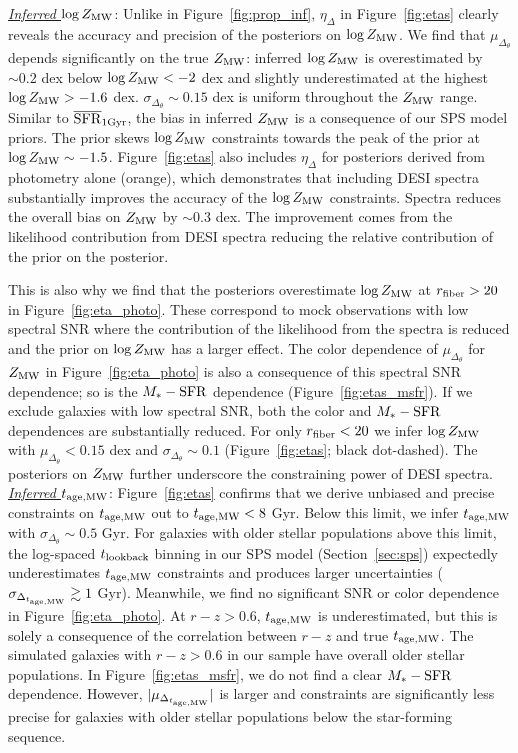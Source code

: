 \noindent \underline{\emph{Inferred $\log Z_{\rm MW}$}}:  
Unlike in Figure~\ref{fig:prop_inf}, $\eta_\Delta$ in Figure~\ref{fig:etas}
clearly reveals the accuracy and precision of the posteriors on $\log Z_{\rm MW}$. 
We find that $\mu_{\Delta_{\theta}}$ depends significantly on the true $Z_{\rm MW}$: 
inferred $\log Z_{\rm MW}$ is overestimated by ${\sim}0.2$ dex below $\log Z_{\rm MW} <
-2$ dex and slightly underestimated at the highest $\log Z_{\rm MW} > -1.6$ dex.
$\sigma_{\Delta_\theta} \sim 0.15$ dex is uniform throughout the $Z_{\rm MW}$ range.
Similar to $\overline{\rm SFR}_{\rm 1Gyr}$, the bias in inferred $Z_{\rm MW}$ is a consequence of our SPS
model priors. 
The prior skews $\log Z_{\rm MW}$ constraints towards the peak of the prior at
$\log Z_{\rm MW}\sim-1.5$. 
Figure~\ref{fig:etas} also includes $\eta_\Delta$ for posteriors derived from
photometry alone (orange), which demonstrates that including DESI spectra
substantially improves the accuracy of the $\log Z_{\rm MW}$ constraints.
Spectra reduces the overall bias on $Z_{\rm MW}$ by $\sim$0.3 dex. 
The improvement comes from the likelihood contribution from DESI spectra
reducing the relative contribution of the prior on the posterior. 

This is also why we find that the posteriors overestimate $\log Z_{\rm MW}$ at 
$r_{\rm fiber} > 20$ in Figure~\ref{fig:eta_photo}.
These correspond to mock observations with low spectral SNR where the
contribution of the likelihood from the spectra is reduced and the prior on
$\log Z_{\rm MW}$ has a larger effect.
The color dependence of $\mu_{\Delta_\theta}$ for $Z_{\rm MW}$ in
Figure~\ref{fig:eta_photo} is also a consequence of this spectral SNR
dependence; so is the $M_*-{\rm SFR}$ dependence (Figure~\ref{fig:etas_msfr}).
If we exclude galaxies with low spectral SNR, both the color and $M_*-{\rm
SFR}$  dependences are substantially reduced.
For only $r_{\rm fiber} < 20$ we infer $\log Z_{\rm MW}$ with
$\mu_{\Delta_\theta}<0.15$ dex and $\sigma_{\Delta_\theta}\sim0.1$
(Figure~\ref{fig:etas}; black dot-dashed). 
The posteriors on $Z_{\rm MW}$ further underscore the constraining power of DESI
spectra. \\

\noindent \underline{\emph{Inferred $t_{\rm age, MW}$}}:  
Figure~\ref{fig:etas} confirms that we derive unbiased and precise constraints
on $t_{\rm age, MW}$ out to $t_{\rm age, MW} < 8$ Gyr. 
Below this limit, we infer $t_{\rm age, MW}$ with $\sigma_{\Delta_\theta}{\sim}0.5$ Gyr.
For galaxies with older stellar populations above this limit, the log-spaced
$t_{\rm lookback}$ binning in our SPS model (Section~\ref{sec:sps}) expectedly
underestimates $t_{\rm age, MW}$ constraints and produces larger uncertainties 
($\sigma_{\Delta_{t_{\rm age, MW}}} \gtrsim 1$ Gyr). 
Meanwhile, we find no significant SNR or color dependence in
Figure~\ref{fig:eta_photo}. 
At $r - z > 0.6$, $t_{\rm age, MW}$ is underestimated, but this is solely a consequence
of the correlation between $r-z$ and true $t_{\rm age, MW}$. 
The simulated galaxies with $r - z > 0.6$ in our sample have overall older
stellar populations. 
In Figure~\ref{fig:etas_msfr}, we do not find a clear $M_*-{\rm SFR}$
dependence. 
However, $|\mu_{\Delta_{t_{\rm age, MW}}}|$ is larger and constraints are significantly
less precise for galaxies with older stellar populations below the star-forming sequence.  \\

